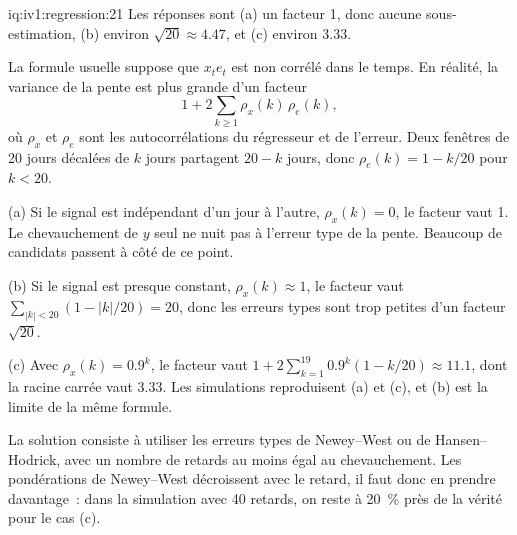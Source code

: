 \begin{solution}{iq:iv1:regression:21}
Les réponses sont (a) un facteur 1, donc aucune sous-estimation, (b) environ $\sqrt{20} \approx 4.47$, et (c) environ $3.33$.

La formule usuelle suppose que $x_t e_t$ est non corrélé dans le temps. En réalité, la variance de la pente est plus grande d'un facteur
\[
1 + 2 \sum_{k \ge 1} \rho_x(k)\,\rho_e(k) ,
\]
où $\rho_x$ et $\rho_e$ sont les autocorrélations du régresseur et de l'erreur. Deux fenêtres de 20 jours décalées de $k$ jours partagent $20 - k$ jours, donc $\rho_e(k) = 1 - k/20$ pour $k < 20$.

(a) Si le signal est indépendant d'un jour à l'autre, $\rho_x(k) = 0$, le facteur vaut 1. Le chevauchement de $y$ seul ne nuit pas à l'erreur type de la pente. Beaucoup de candidats passent à côté de ce point.

(b) Si le signal est presque constant, $\rho_x(k) \approx 1$, le facteur vaut $\sum_{|k|<20}(1 - |k|/20) = 20$, donc les erreurs types sont trop petites d'un facteur $\sqrt{20}$.

(c) Avec $\rho_x(k) = 0.9^k$, le facteur vaut $1 + 2\sum_{k=1}^{19} 0.9^k(1 - k/20) \approx 11.1$, dont la racine carrée vaut $3.33$. Les simulations reproduisent (a) et (c), et (b) est la limite de la même formule.

La solution consiste à utiliser les erreurs types de Newey--West ou de Hansen--Hodrick, avec un nombre de retards au moins égal au chevauchement. Les pondérations de Newey--West décroissent avec le retard, il faut donc en prendre davantage~: dans la simulation avec 40 retards, on reste à 20~\% près de la vérité pour le cas (c).

\end{solution}

